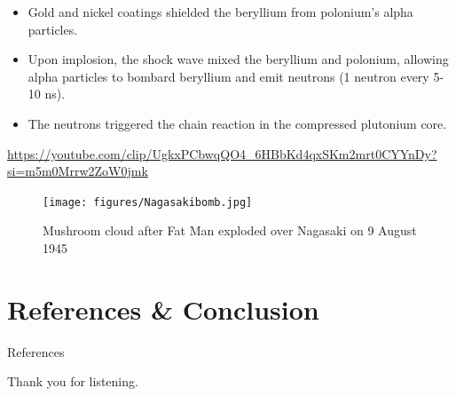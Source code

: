 \documentclass{loyola-beamer}
\begin{document}
\begin{frame}
	\begin{itemize}
		\item Gold and nickel coatings shielded the beryllium from polonium's alpha particles.
		\item Upon implosion, the shock wave mixed the beryllium and polonium, allowing alpha particles to bombard beryllium and emit neutrons (1 neutron every 5-10 ns).
		\item The neutrons triggered the chain reaction in the compressed plutonium core.
	\end{itemize}
\end{frame}

\begin{frame}
	\url{https://youtube.com/clip/UgkxPCbwqQO4_6HBbKd4qxSKm2mrt0CYYnDy?si=m5m0Mrrw2ZoW0jmk}
\end{frame}

\begin{frame}
	\begin{figure}
		\begin{center}
			\texttt{[image: figures/Nagasakibomb.jpg]}
		\end{center}
		\caption{Mushroom cloud after Fat Man exploded over Nagasaki on 9 August 1945}
	\end{figure}

\end{frame}

\section{References \& Conclusion}


\begin{frame}{References}
	
	
\end{frame}

\begin{titleframe}{Thank you for listening.}
\end{titleframe}
\end{document}
